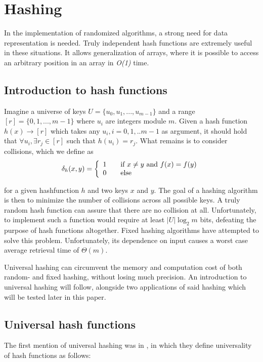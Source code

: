 \documentclass[../../main.tex]{subfiles}
\begin{document}
\section*{Hashing}
In the implementation of randomized algorithms, a strong need for data representation is needed. Truly independent hash functions are extremely useful in these situations. It allows generalization of arrays, where it is possible to access an arbitrary position in an array in \textit{O(1)} time.\\

\subsection*{Introduction to hash functions}
Imagine a universe of keys $U=\{u_{0},u_{1},...,u_{m-1}\}$ and a range $[r]=\{0,1,...,m-1\}$ where $u_i$ are integers module $m$. Given a hash function $h(x)\rightarrow [r]$ which takes any $u_i,i=0,1,..m-1$ as argument, it should hold that $\forall u_i,\exists r_j \in [r]$ such that $h(u_i)= r_j$. What remains is to consider collisions, which we define as
\begin{equation}\label{collision}
\delta_h(x,y) = \left\{ 
  \begin{array}{l l}
    1 & \quad \text{if $x\neq y$ and $f(x)=f(y)$}\\
    0 & \quad \text{else}
  \end{array} \right.
\end{equation}

for a given hashfunction $h$ and two keys $x$ and $y$. The goal of a hashing algorithm is then to minimize the number of collisions across all possible keys. A truly random hash function can assure that there are no collision at all. Unfortunately, to implement such a function would require at least $|U|\log_2 m$ bits\cite{dikuHash}, defeating the purpose of hash functions altogether.
Fixed hashing algorithms have attempted to solve this problem. Unfortunately, its dependence on input causes a worst case average retrieval time of $\Theta(m)$.\cite{introToAlg}

Universal hashing can circumvent the memory and computation cost of both random- and fixed hashing, without losing much precision. An introduction to universal hashing will follow, alongside two applications of said hashing which will be tested later in this paper.

\subsection*{Universal hash functions}
The first mention of universal hashing was in \cite{carterWegman}, in which they define universality of hash functions as follows:\\
\end{document}
